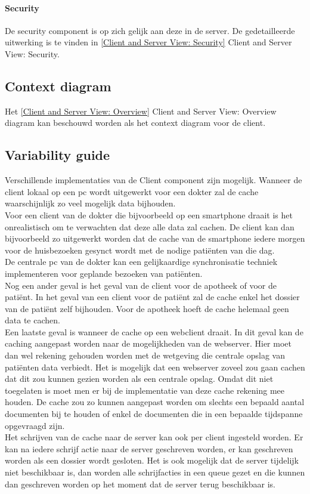 \documentclass[a4paper,10pt]{article}
\begin{document}
\paragraph{Security}
De security component is op zich gelijk aan deze in de server.  De gedetailleerde uitwerking is te vinden in \ref{Client and Server View: Security} Client and Server View: Security.

\subsection{Context diagram}
Het \ref{Client and Server View: Overview} Client and Server View: Overview diagram kan beschouwd worden als het context diagram voor de client.

\subsection{Variability guide}
Verschillende implementaties van de Client component zijn mogelijk.  Wanneer de client lokaal op een pc wordt uitgewerkt voor een dokter zal de cache waarschijnlijk zo veel mogelijk data bijhouden.\\
Voor een client van de dokter die bijvoorbeeld op een smartphone draait is het onrealistisch om te verwachten dat deze alle data zal cachen.  De client kan dan bijvoorbeeld zo uitgewerkt worden dat de cache van de smartphone iedere morgen voor de huisbezoeken gesynct wordt met de nodige pati\"{e}nten van die dag.\\
De centrale pc van de dokter kan een gelijkaardige synchronisatie techniek implementeren voor geplande bezoeken van pati\"{e}nten.\\
Nog een ander geval is het geval van de client voor de apotheek of voor de pati\"{e}nt.  In het geval van een client voor de pati\"{e}nt zal de cache enkel het dossier van de pati\"{e}nt zelf bijhouden.  Voor de apotheek hoeft de cache helemaal geen data te cachen.\\
Een laatste geval is wanneer de cache op een webclient draait.  In dit geval kan de caching aangepast worden naar de mogelijkheden van de webserver.  Hier moet dan wel rekening gehouden worden met de wetgeving die centrale opslag van pati\"{e}nten data verbiedt.  Het is mogelijk dat een webserver zoveel zou gaan cachen dat dit zou kunnen gezien worden als een centrale opslag.  Omdat dit niet toegelaten is moet men er bij de implementatie van deze cache rekening mee houden.  De cache zou zo kunnen aangepast worden om slechts een bepaald aantal documenten bij te houden of enkel de documenten die in een bepaalde tijdspanne opgevraagd zijn.\\
Het schrijven van de cache naar de server kan ook per client ingesteld worden.  Er kan na iedere schrijf actie naar de server geschreven worden, er kan geschreven worden als een dossier wordt gesloten.  Het is ook mogelijk dat de server tijdelijk niet beschikbaar is, dan worden alle schrijfacties in een queue gezet en die kunnen dan geschreven worden op het moment dat de server terug beschikbaar is.
\end{document}
